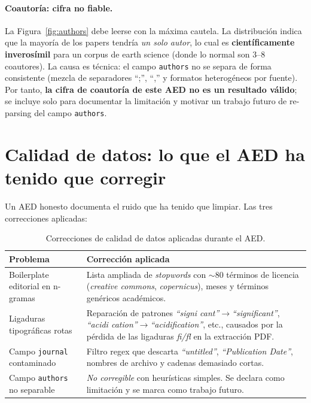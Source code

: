 \documentclass[11pt,a4paper]{article}
\begin{document}
\paragraph{Coautoría: cifra no fiable.} La Figura~\ref{fig:authors} debe leerse con la máxima cautela. La distribución indica que la mayoría de los papers tendría \emph{un solo autor}, lo cual es \textbf{científicamente inverosímil} para un corpus de earth science (donde lo normal son 3--8 coautores). La causa es técnica: el campo \texttt{authors} no se separa de forma consistente (mezcla de separadores ``;'', ``,'' y formatos heterogéneos por fuente). Por tanto, \textbf{la cifra de coautoría de este AED no es un resultado válido}; se incluye solo para documentar la limitación y motivar un trabajo futuro de re-parsing del campo \texttt{authors}.

\section{Calidad de datos: lo que el AED ha tenido que corregir}\label{sec:calidad}

Un AED honesto documenta el ruido que ha tenido que limpiar. Las tres correcciones aplicadas:

\begin{table}[h]
\centering\small
\begin{tabularx}{\linewidth}{l X}
\toprule
\textbf{Problema} & \textbf{Corrección aplicada} \\
\midrule
Boilerplate editorial en n-gramas & Lista ampliada de \emph{stopwords} con $\sim$80 términos de licencia (\emph{creative commons}, \emph{copernicus}), meses y términos genéricos académicos. \\
Ligaduras tipográficas rotas & Reparación de patrones \emph{``signi cant''}$\to$\emph{``significant''}, \emph{``acidi cation''}$\to$\emph{``acidification''}, etc., causados por la pérdida de las ligaduras \emph{fi/fl} en la extracción PDF. \\
Campo \texttt{journal} contaminado & Filtro regex que descarta \emph{``untitled''}, \emph{``Publication Date''}, nombres de archivo y cadenas demasiado cortas. \\
Campo \texttt{authors} no separable & \emph{No corregible} con heurísticas simples. Se declara como limitación y se marca como trabajo futuro. \\
\bottomrule
\end{tabularx}
\caption{Correcciones de calidad de datos aplicadas durante el AED.}
\end{table}
\end{document}

